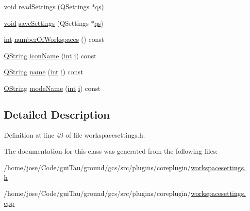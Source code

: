 \begin{DoxyCompactItemize}
\item 
\hyperlink{group___u_a_v_objects_plugin_ga444cf2ff3f0ecbe028adce838d373f5c}{void} \hyperlink{group___core_plugin_ga0079ab041ae768fb765979fa21b4f492}{read\-Settings} (Q\-Settings $\ast$\hyperlink{analyze_i_n_s_g_p_s_8m_a620a138c8981e0536c569d7761df4548}{qs})
\item 
\hyperlink{group___u_a_v_objects_plugin_ga444cf2ff3f0ecbe028adce838d373f5c}{void} \hyperlink{group___core_plugin_ga1b31a14b266c4c7510783a9cf8e7fc8c}{save\-Settings} (Q\-Settings $\ast$\hyperlink{analyze_i_n_s_g_p_s_8m_a620a138c8981e0536c569d7761df4548}{qs})
\item 
\hyperlink{ioapi_8h_a787fa3cf048117ba7123753c1e74fcd6}{int} \hyperlink{group___core_plugin_ga46a6c14d88c85a5ef0b125638b90141e}{number\-Of\-Workspaces} () const 
\item 
\hyperlink{group___u_a_v_objects_plugin_gab9d252f49c333c94a72f97ce3105a32d}{Q\-String} \hyperlink{group___core_plugin_ga192b99d6e0131b46373653b9062fc396}{icon\-Name} (\hyperlink{ioapi_8h_a787fa3cf048117ba7123753c1e74fcd6}{int} \hyperlink{uavobjecttemplate_8m_a6f6ccfcf58b31cb6412107d9d5281426}{i}) const 
\item 
\hyperlink{group___u_a_v_objects_plugin_gab9d252f49c333c94a72f97ce3105a32d}{Q\-String} \hyperlink{group___core_plugin_gaca9adc4c2ff0dc7f6537d248d9ed99c1}{name} (\hyperlink{ioapi_8h_a787fa3cf048117ba7123753c1e74fcd6}{int} \hyperlink{uavobjecttemplate_8m_a6f6ccfcf58b31cb6412107d9d5281426}{i}) const 
\item 
\hyperlink{group___u_a_v_objects_plugin_gab9d252f49c333c94a72f97ce3105a32d}{Q\-String} \hyperlink{group___core_plugin_gac647d36361c035d0534bf2a6f52bbcdd}{mode\-Name} (\hyperlink{ioapi_8h_a787fa3cf048117ba7123753c1e74fcd6}{int} \hyperlink{uavobjecttemplate_8m_a6f6ccfcf58b31cb6412107d9d5281426}{i}) const 
\end{DoxyCompactItemize}


\subsection{Detailed Description}


Definition at line 49 of file workspacesettings.\-h.



The documentation for this class was generated from the following files\-:\begin{DoxyCompactItemize}
\item 
/home/jose/\-Code/gui\-Tau/ground/gcs/src/plugins/coreplugin/\hyperlink{workspacesettings_8h}{workspacesettings.\-h}\item 
/home/jose/\-Code/gui\-Tau/ground/gcs/src/plugins/coreplugin/\hyperlink{workspacesettings_8cpp}{workspacesettings.\-cpp}\end{DoxyCompactItemize}
